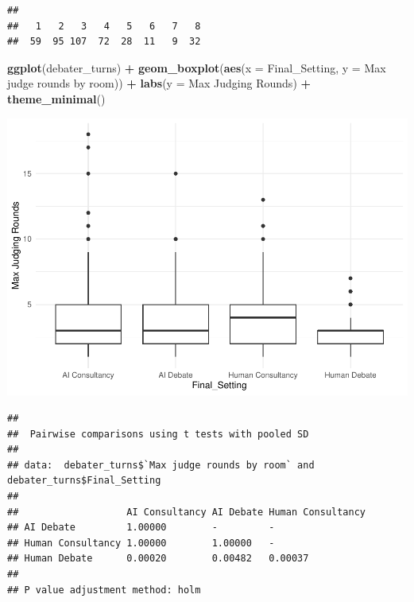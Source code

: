 \documentclass[
]{article}
\newenvironment{Shaded}{\begin{snugshade}}{\end{snugshade}}
\newcommand{\AttributeTok}[1]{\textcolor[rgb]{0.13,0.29,0.53}{#1}}
\newcommand{\FunctionTok}[1]{\textcolor[rgb]{0.13,0.29,0.53}{\textbf{#1}}}
\newcommand{\NormalTok}[1]{#1}
\newcommand{\SpecialCharTok}[1]{\textcolor[rgb]{0.81,0.36,0.00}{\textbf{#1}}}
\newcommand{\StringTok}[1]{\textcolor[rgb]{0.31,0.60,0.02}{#1}}
\begin{document}
\begin{verbatim}
## 
##   1   2   3   4   5   6   7   8 
##  59  95 107  72  28  11   9  32
\end{verbatim}

\begin{Shaded}
\begin{Highlighting}[]
\FunctionTok{ggplot}\NormalTok{(debater\_turns) }\SpecialCharTok{+}
  \FunctionTok{geom\_boxplot}\NormalTok{(}\FunctionTok{aes}\NormalTok{(}\AttributeTok{x =}\NormalTok{ Final\_Setting, }\AttributeTok{y =} \StringTok{\textasciigrave{}}\AttributeTok{Max judge rounds by room}\StringTok{\textasciigrave{}}\NormalTok{)) }\SpecialCharTok{+}
  \FunctionTok{labs}\NormalTok{(}\AttributeTok{y =} \StringTok{\textquotesingle{}Max Judging Rounds\textquotesingle{}}\NormalTok{) }\SpecialCharTok{+}
  \FunctionTok{theme\_minimal}\NormalTok{() }
\end{Highlighting}
\end{Shaded}

\includegraphics[width=1\linewidth]{debate-2309_files/figure-latex/rounds graph-1}

\begin{Shaded}
\end{Shaded}

\begin{verbatim}
## 
##  Pairwise comparisons using t tests with pooled SD 
## 
## data:  debater_turns$`Max judge rounds by room` and debater_turns$Final_Setting 
## 
##                   AI Consultancy AI Debate Human Consultancy
## AI Debate         1.00000        -         -                
## Human Consultancy 1.00000        1.00000   -                
## Human Debate      0.00020        0.00482   0.00037          
## 
## P value adjustment method: holm
\end{verbatim}
\end{document}
